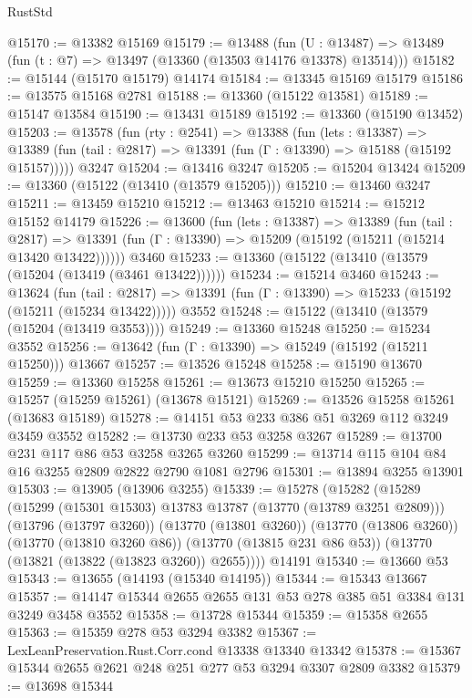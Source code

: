 \begin{lexlean}{RustStd}
\begin{coremodule}
@15170 := @13382 @15169
@15179 := @13488
    (fun (U : @13487) => @13489 (fun (t : @7) => @13497 (@13360 (@13503 @14176 @13378) @13514)))
@15182 := @15144 (@15170 @15179) @14174
@15184 := @13345 @15169 @15179
@15186 := @13575 @15168 @2781
@15188 := @13360 (@15122 @13581)
@15189 := @15147 @13584
@15190 := @13431 @15189
@15192 := @13360 (@15190 @13452)
@15203 := @13578
    (fun (rty : @2541) =>
    @13388
      (fun (lets : @13387) =>
      @13389 (fun (tail : @2817) => @13391 (fun (Γ : @13390) => @15188 (@15192 @15157)))))
    @3247
@15204 := @13416 @3247
@15205 := @15204 @13424
@15209 := @13360 (@15122 (@13410 (@13579 @15205)))
@15210 := @13460 @3247
@15211 := @13459 @15210
@15212 := @13463 @15210
@15214 := @15212 @15152 @14179
@15226 := @13600
    (fun (lets : @13387) =>
    @13389
      (fun (tail : @2817) =>
      @13391 (fun (Γ : @13390) => @15209 (@15192 (@15211 (@15214 @13420 @13422))))))
    @3460
@15233 := @13360 (@15122 (@13410 (@13579 (@15204 (@13419 (@3461 @13422))))))
@15234 := @15214 @3460
@15243 := @13624
    (fun (tail : @2817) => @13391 (fun (Γ : @13390) => @15233 (@15192 (@15211 (@15234 @13422)))))
    @3552
@15248 := @15122 (@13410 (@13579 (@15204 (@13419 @3553))))
@15249 := @13360 @15248
@15250 := @15234 @3552
@15256 := @13642 (fun (Γ : @13390) => @15249 (@15192 (@15211 @15250))) @13667
@15257 := @13526 @15248
@15258 := @15190 @13670
@15259 := @13360 @15258
@15261 := @13673 @15210 @15250
@15265 := @15257 (@15259 @15261) (@13678 @15121)
@15269 := @13526 @15258 @15261 (@13683 @15189)
@15278 := @14151 @53 @233 @386 @51 @3269 @112 @3249 @3459 @3552
@15282 := @13730 @233 @53 @3258 @3267
@15289 := @13700 @231 @117 @86 @53 @3258 @3265 @3260
@15299 := @13714 @115 @104 @84 @16 @3255 @2809 @2822 @2790 @1081 @2796
@15301 := @13894 @3255 @13901
@15303 := @13905 (@13906 @3255)
@15339 := @15278
    (@15282
      (@15289
        (@15299 (@15301 @15303) @13783 @13787 (@13770 (@13789 @3251 @2809)))
        (@13796 (@13797 @3260))
        (@13770 (@13801 @3260))
        (@13770 (@13806 @3260))
        (@13770 (@13810 @3260 @86))
        (@13770 (@13815 @231 @86 @53))
        (@13770 (@13821 (@13822 (@13823 @3260)) @2655))))
    @14191
@15340 := @13660 @53
@15343 := @13655 (@14193 (@15340 @14195))
@15344 := @15343 @13667
@15357 := @14147 @15344 @2655 @2655 @131 @53 @278 @385 @51 @3384 @131 @3249 @3458 @3552
@15358 := @13728 @15344
@15359 := @15358 @2655
@15363 := @15359 @278 @53 @3294 @3382
@15367 := LexLeanPreservation.Rust.Corr.cond @13338 @13340 @13342
@15378 := @15367 @15344 @2655 @2621 @248 @251 @277 @53 @3294 @3307 @2809 @3382
@15379 := @13698 @15344

\end{coremodule}
\end{lexlean}

